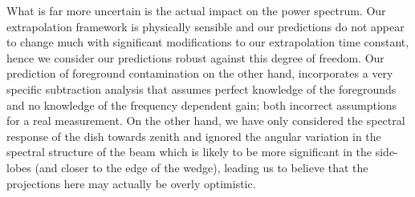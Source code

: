 \documentclass[useAMS,usenatbib]{mn2e}
\begin{document}
What is far more uncertain is the actual impact on the power spectrum. Our extrapolation framework is physically sensible and our predictions do not appear to change much with significant modifications to our extrapolation time constant, hence we consider our predictions robust against this degree of freedom. Our prediction of foreground contamination on the other hand, incorporates a very specific subtraction analysis that assumes perfect knowledge of the foregrounds and no knowledge of the frequency dependent gain; both incorrect assumptions for a real measurement. On the other hand, we have only considered the spectral response of the dish towards zenith and ignored the angular variation in the spectral structure of the beam which is likely to be more significant in the side-lobes (and closer to the edge of the wedge), leading us to believe that the projections here may actually be overly optimistic. 
\end{document}
